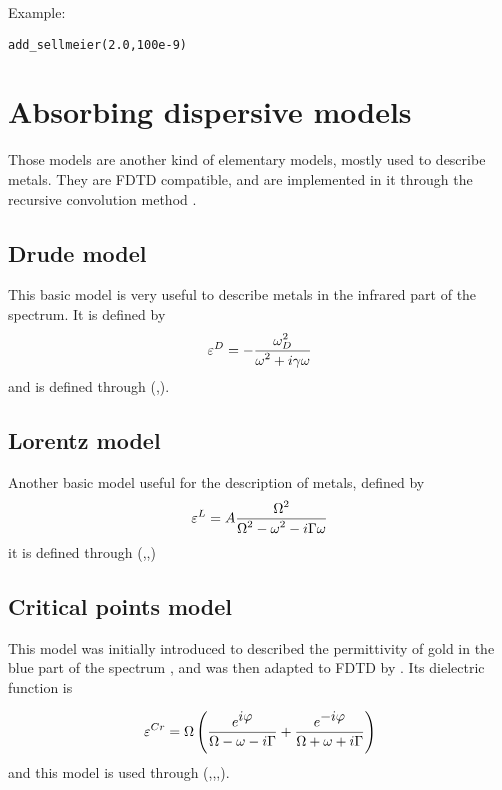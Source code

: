 Example:
\begin{lstlisting}
add_sellmeier(2.0,100e-9)
\end{lstlisting}

\section{Absorbing dispersive models}

	Those models are another kind of elementary models, mostly used to describe metals. They are FDTD compatible, and are implemented in it through the recursive convolution method \cite{Luebbers:90}.
	
\subsection{Drude model}

This basic model is very useful to describe metals in the infrared part of the spectrum. It is defined by
\begin{equation}
\varepsilon^D=-\frac{\displaystyle \omega_D^2}{\displaystyle \omega^2+i\gamma\omega}
\end{equation}
and is defined through (,\lft{$\gamma$}).

\subsection{Lorentz model}

Another basic model useful for the description of metals, defined by
\begin{equation}
\varepsilon^L=A\frac{\displaystyle \Omega^2}{\displaystyle \Omega^2-\omega^2-i\Gamma\omega}
\end{equation}
it is defined through (,\lft{$\Omega$},\lft{$\Gamma$})

\subsection{Critical points model}

This model was initially introduced to described the permittivity of gold in the blue part of the spectrum \cite{Etchegoin:06}, and was then adapted to FDTD by \cite{Vial:07}. Its dielectric function is
	
\begin{equation}
\varepsilon^{Cr}=\Omega\left(\frac{\displaystyle e^{\displaystyle i\varphi}}{\displaystyle \Omega-\omega-i\Gamma}+\frac{\displaystyle e^{\displaystyle -i\varphi}}{\displaystyle \Omega+\omega+i\Gamma}\right)
\end{equation}
and this model is used through (,\lft{$\Omega$},\lft{$\varphi$},\lft{$\Gamma$}).

